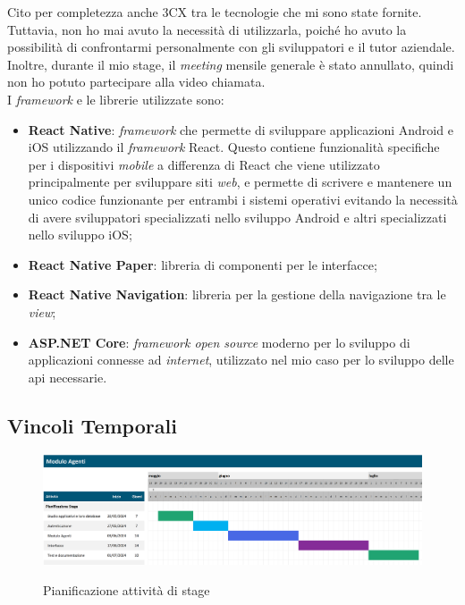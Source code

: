 Cito per completezza anche 3CX tra le tecnologie che mi sono state fornite. Tuttavia, non ho mai avuto la necessità di utilizzarla, 
poiché ho avuto la possibilità di confrontarmi personalmente con gli sviluppatori e il tutor aziendale. Inoltre, durante 
il mio stage, il 
\textit{meeting} mensile generale è stato annullato, quindi non ho potuto partecipare alla video chiamata.\\
I \textit{framework} e le librerie utilizzate sono:
\begin{itemize}
    \item \textbf{React Native}: \textit{framework} che permette di sviluppare applicazioni Android e iOS utilizzando il 
    \textit{framework} React. Questo contiene funzionalità specifiche per i dispositivi \textit{mobile} a differenza di 
    React che viene utilizzato principalmente per sviluppare siti \textit{web}, e permette di scrivere e mantenere un unico 
    codice funzionante per entrambi i sistemi operativi evitando la necessità di avere sviluppatori specializzati nello 
    sviluppo Android e altri specializzati nello sviluppo iOS;
    \item \textbf{React Native Paper}: libreria di componenti per le interfacce;
    \item \textbf{React Native Navigation}: libreria per la gestione della navigazione tra le \textit{view};
    \item \textbf{ASP.NET Core}: \textit{framework open source} moderno per lo sviluppo di applicazioni connesse ad \textit{internet}, 
          utilizzato nel mio caso per lo sviluppo delle \gls{api} necessarie.
\end{itemize}

\subsection{Vincoli Temporali}\label{chap:vincoli temporali}
\begin{figure}[H]
    \centering
    \includegraphics[alt={Pianificazione attività di stage}, width=\textwidth]{img/gantt pianificazione.png}
    \caption[Pianificazione attività di stage]
            {Pianificazione attività di stage}
    \label{fig:pianificazione stage}
\end{figure}

